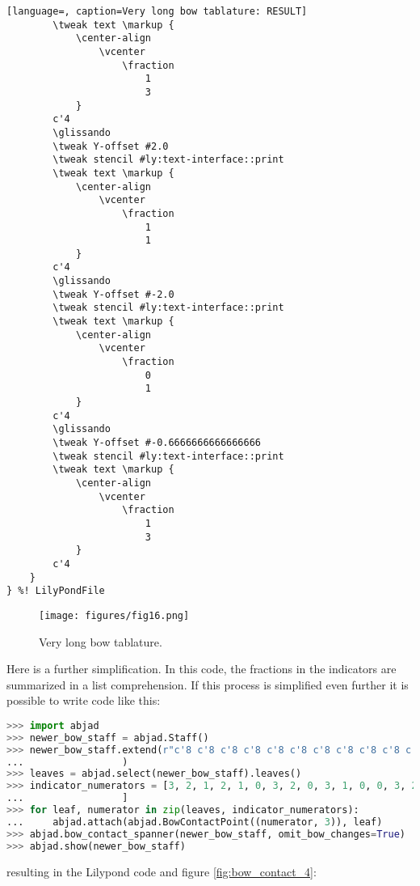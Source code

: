 \begin{lstlisting}[language=, caption=Very long bow tablature: RESULT]
        \tweak text \markup {
            \center-align
                \vcenter
                    \fraction
                        1
                        3
            }
        c'4
        \glissando
        \tweak Y-offset #2.0
        \tweak stencil #ly:text-interface::print
        \tweak text \markup {
            \center-align
                \vcenter
                    \fraction
                        1
                        1
            }
        c'4
        \glissando
        \tweak Y-offset #-2.0
        \tweak stencil #ly:text-interface::print
        \tweak text \markup {
            \center-align
                \vcenter
                    \fraction
                        0
                        1
            }
        c'4
        \glissando
        \tweak Y-offset #-0.6666666666666666
        \tweak stencil #ly:text-interface::print
        \tweak text \markup {
            \center-align
                \vcenter
                    \fraction
                        1
                        3
            }
        c'4
    }
} %! LilyPondFile
\end{lstlisting}
\doublespace

\singlespace
\begin{figure}[h]
  \texttt{[image: figures/fig16.png]}
  \caption{Very long bow tablature.}
  \label{fig:bow_contact_3}
\end{figure}
\doublespace

Here is a further simplification. In this code, the fractions in the indicators are summarized in a list comprehension. If this process is simplified even further it is possible to write code like this:

\singlespace
\begin{lstlisting}[language=Python, caption=Extremely long bow tablature]
>>> import abjad
>>> newer_bow_staff = abjad.Staff()
>>> newer_bow_staff.extend(r"c'8 c'8 c'8 c'8 c'8 c'8 c'8 c'8 c'8 c'8 c'8 c'8 c'8 c'8 c'8 ... 					c'8 c'8 c'8 c'8 c'8 c'8 c'8 c'8 c'8"
...					)
>>> leaves = abjad.select(newer_bow_staff).leaves()
>>> indicator_numerators = [3, 2, 1, 2, 1, 0, 3, 2, 0, 3, 1, 0, 0, 3, 2, 3, 2, 1, 1, 0, 3, ... 					2, 1, 0,
...					]
>>> for leaf, numerator in zip(leaves, indicator_numerators):
...     abjad.attach(abjad.BowContactPoint((numerator, 3)), leaf)
>>> abjad.bow_contact_spanner(newer_bow_staff, omit_bow_changes=True)
>>> abjad.show(newer_bow_staff)
\end{lstlisting}
\doublespace

resulting in the Lilypond code and figure \ref{fig:bow_contact_4}:

